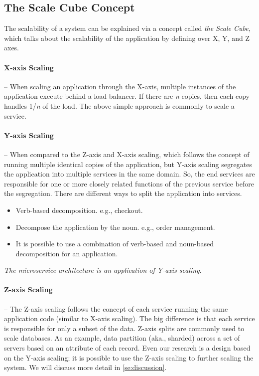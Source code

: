 \subsection{The Scale Cube Concept}
\label{subse:scale_cube}

The scalability of a system can be explained via a concept called \emph{the Scale Cube}, which talks about the scalability of the application by defining over X, Y, and Z axes.

\paragraph{X-axis Scaling}-- When scaling an application through the X-axis, multiple instances of the application execute behind a load balancer. If there are \textit{n} copies, then each copy handles 1/\textit{n} of the load. The above simple approach is commonly to scale a service.

\paragraph{Y-axis Scaling}-- When compared to the Z-axis and X-axis scaling, which follows the concept of running multiple identical copies of the application, but Y-axis scaling segregates the application into multiple services in the same domain. So, the end services are responsible for one or more closely related functions of the previous service before the segregation. There are different ways to split the application into services.
\begin{itemize}
    \item Verb-based decomposition. e.g., checkout.
    \item Decompose the application by the noun. e.g., order management.
    \item It is possible to use a combination of verb-based and noun-based decomposition for an application.
\end{itemize}
\emph{The microservice architecture is an application of Y-axis scaling}.

\paragraph{Z-axis Scaling}-- The Z-axis scaling follows the concept of each service running the same application code (similar to X-axis scaling). The big difference is that each service is responsible for only a subset of the data. Z-axis splits are commonly used to scale databases. As an example, data partition (aka., sharded) across a set of servers based on an attribute of each record.
Even our research is a design based on the Y-axis scaling; it is possible to use the Z-axis scaling to further scaling the system. We will discuss more detail in \cref{se:discussion}.


